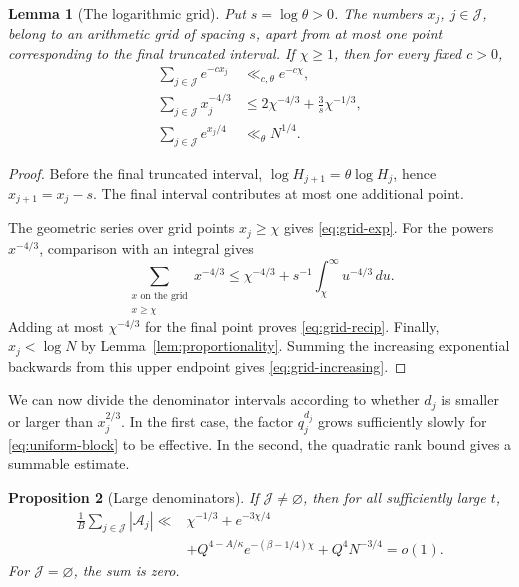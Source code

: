 \documentclass[11pt,reqno]{amsart}
\theoremstyle{definition}
\theoremstyle{plain}
\newtheorem{lemma}{Lemma}[section]
\newtheorem{proposition}[lemma]{Proposition}
\theoremstyle{definition}
\theoremstyle{remark}
\newcommand{\Bad}{\mathcal A}
\begin{document}
\begin{lemma}[The logarithmic grid]\label{lem:grid}
Put $s=\log\theta>0$. The numbers $x_j$,
$j\in\mathcal J$, belong to an arithmetic
grid of spacing $s$, apart from at most one
point corresponding to the final truncated
interval. If $\chi\ge1$, then for every fixed
$c>0$,
\begin{align}
 \sum_{j\in\mathcal J}e^{-cx_j}
 &\ll_{c,\theta}e^{-c\chi},
 \label{eq:grid-exp}\\
 \sum_{j\in\mathcal J}x_j^{-4/3}
 &\le2\chi^{-4/3}+\frac3s\chi^{-1/3},
 \label{eq:grid-recip}\\
 \sum_{j\in\mathcal J}e^{x_j/4}
 &\ll_\theta N^{1/4}.
 \label{eq:grid-increasing}
\end{align}
\end{lemma}

\begin{proof}
Before the final truncated interval,
$\log H_{j+1}=\theta\log H_j$, hence
$x_{j+1}=x_j-s$. The final interval
contributes at most one additional point.

The geometric series over grid points
$x_j\ge\chi$ gives \eqref{eq:grid-exp}.
For the powers $x^{-4/3}$, comparison
with an integral gives
\[
 \sum_{\substack{x\text{ on the grid}\\x\ge\chi}}
 x^{-4/3}
 \le\chi^{-4/3}
 +s^{-1}\int_\chi^\infty u^{-4/3}\,du.
\]
Adding at most $\chi^{-4/3}$ for the final
point proves \eqref{eq:grid-recip}.
Finally, $x_j<\log N$ by
Lemma~\ref{lem:proportionality}. Summing
the increasing exponential backwards from
this upper endpoint gives
\eqref{eq:grid-increasing}.
\end{proof}

We can now divide the denominator intervals
according to whether $d_j$ is smaller or
larger than $x_j^{2/3}$. In the first case,
the factor $q_j^{d_j}$ grows sufficiently
slowly for \eqref{eq:uniform-block} to be
effective. In the second, the quadratic
rank bound gives a summable estimate.

\begin{proposition}[Large denominators]
\label{prop:large-denominators}
If $\mathcal J\ne\varnothing$, then for
all sufficiently large $t$,
\begin{equation}\label{eq:large-denominators}
 \begin{aligned}
 \frac1B\sum_{j\in\mathcal J}|\Bad_j|
 \ll{}&\chi^{-1/3}+e^{-3\chi/4}\\
 &+Q^{4-A/\kappa}e^{-(\beta-1/4)\chi}
 +Q^4N^{-3/4}=o(1).
 \end{aligned}
\end{equation}
For $\mathcal J=\varnothing$, the sum is zero.
\end{proposition}
\end{document}
